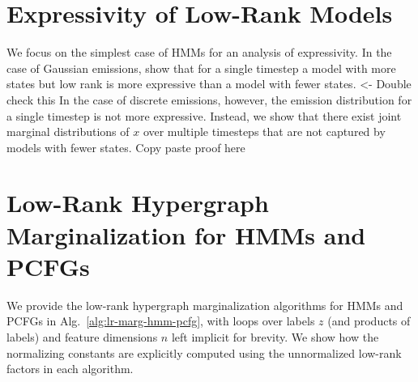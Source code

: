 \documentclass{article}
\begin{document}
\section{\label{sec:expressivity}Expressivity of Low-Rank Models}
We focus on the simplest case of HMMs for an analysis of expressivity.
In the case of Gaussian emissions, \citet{rrhmm} show that for a single timestep a model with more states but low rank is more expressive than a model with fewer states. {\color{red}<- Double check this}
In the case of discrete emissions, however, the emission distribution for a single timestep is not more expressive. Instead, we show that there exist joint marginal distributions of $x$ over multiple timesteps that are not captured by models with fewer states.
{\color{red}Copy paste proof here}

\section{\label{sec:low-rank-marg}Low-Rank Hypergraph Marginalization for HMMs and PCFGs}
We provide the low-rank hypergraph marginalization algorithms for HMMs and PCFGs in
Alg.~\ref{alg:lr-marg-hmm-pcfg},
with loops over labels $z$ (and products of labels) and feature dimensions $n$ left implicit for brevity.
We show how the normalizing constants are explicitly computed using the unnormalized
low-rank factors in each algorithm.
\end{document}
